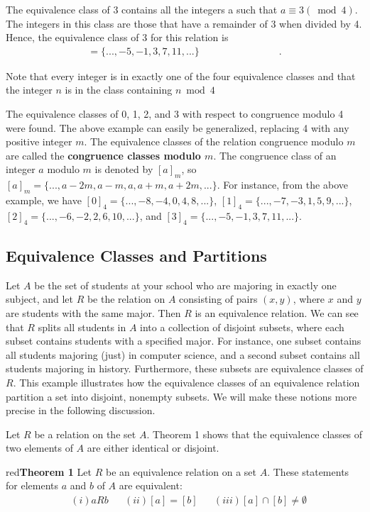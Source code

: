 \documentclass[11pt]{article}
\newenvironment{theorem}[1]{\begin{mybox}{red}{\textbf{Theorem #1}}}{\end{mybox}}
\begin{document}
The equivalence class of 3 contains all the integers a such that $a \equiv 3 (\bmod{ 4})$. The integers in this class are those that have a remainder of 3 when divided by 4. Hence, the equivalence class of 3 for this relation is
\begin{align*}
    [3] = \{..., -5, -1, 3, 7, 11, ...\} & & & & & & & & & &.
\end{align*}

Note that every integer is in exactly one of the four equivalence classes and that the integer $n$ is in the class containing $n \bmod 4$

The equivalence classes of 0, 1, 2, and 3 with respect to congruence modulo 4 were found. The above example can easily be generalized, replacing 4 with any positive integer $m$. The equivalence classes of the relation congruence modulo $m$ are called the \textbf{congruence classes modulo $m$}. The congruence class of an integer $a$ modulo $m$ is denoted by $[a]_m$, so $[a]_m = \{..., a - 2m, a - m, a, a + m, a + 2m, ...\}$. For instance, from the above example, we have $[0]_4 = \{..., -8, -4, 0, 4, 8, ...\}$, $[1]_4 = \{..., -7, -3, 1, 5, 9, ...\}$, $[2]_4 = \{..., -6, -2, 2, 6, 10,...\}$, and $[3]_4 = \{..., -5, -1, 3, 7, 11, ...\}$.

\subsection{Equivalence Classes and Partitions}

Let $A$ be the set of students at your school who are majoring in exactly one subject, and let $R$ be the relation on $A$ consisting of pairs $(x, y)$, where $x$ and $y$ are students with the same major. Then $R$ is an equivalence relation. We can see that $R$ splits all students in $A$ into a collection of disjoint subsets, where each subset contains students with a specified major. For instance, one subset contains all students majoring (just) in computer science, and a second subset contains all students majoring in history. Furthermore, these subsets are equivalence classes of $R$. This example illustrates how the equivalence classes of an equivalence relation partition a set into disjoint, nonempty subsets. We will make these notions more
precise in the following discussion.

Let $R$ be a relation on the set $A$. Theorem 1 shows that the equivalence classes of two elements of $A$ are either identical or disjoint.

\begin{theorem}{1}
Let $R$ be an equivalence relation on a set $A$. These statements for elements $a$ and $b$ of $A$ are equivalent:
\begin{align*}
    &(i) aRb& &(ii) [a] = [b]& &(iii) [a] \cap [b] \neq \emptyset    
\end{align*}
\end{theorem}
\end{document}
